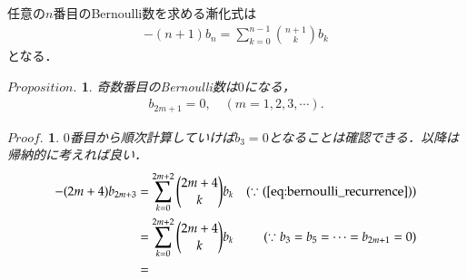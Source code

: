 \documentclass[a4j,papersize,disablejfam,slide,14pt]{jsarticle}
\newtheorem{Prop}{$Proposition.$}
\newtheorem{Proof}{$Proof.$}
\begin{document}
    任意の$n$番目の{\rm Bernoulli}数を求める漸化式は
    \begin{align}
    	-(n+1) b_n = \sum_{k=0}^{n-1} \binom{n+1}{k} b_k \label{eq:bernoulli_recurrence}
    \end{align}
    となる．
    \begin{screen}
    	\begin{Prop}
        	奇数番目の{\rm Bernoulli}数は$0$になる，
            \begin{align}
            	b_{2m+1}=0, \quad (m=1,2,3,\cdots). \label{eq:bernoulli_odd}
            \end{align}
        \end{Prop}
    \end{screen}
    \begin{Proof}
        	$0$番目から順次計算していけば$b_3=0$となることは確認できる．以降は帰納的に考えれば良い．
            \begin{align}
            	-(2m+4) b_{2m+3} &= \sum_{k=0}^{2m+2} \binom{2m+4}{k} b_k & (\because (\refeq{eq:bernoulli_recurrence}))\\
                &= \sum_{k=0}^{2m+2} \binom{2m+4}{k} b_k & (\because b_3=b_5=\cdots=b_{2m+1} = 0) \\
                &= 
            \end{align}
    \end{Proof}
    
\end{document}
